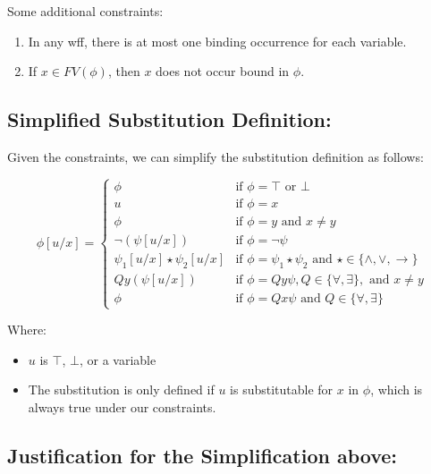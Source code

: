 \documentclass{article}
\begin{document}
Some additional constraints:
\begin{enumerate}
    \item In any wff, there is at most one binding occurrence for each variable.
    \item If $x \in FV(\phi)$, then $x$ does not occur bound in $\phi$.
\end{enumerate}

\subsection*{Simplified Substitution Definition:}

Given the constraints, we can simplify the substitution definition as follows:

\[
\phi[u/x] =
\begin{cases}
    \phi                   & \text{if } \phi = \top \text{ or } \bot \\
    u                      & \text{if } \phi = x \\
    \phi                   & \text{if } \phi = y \text{ and } x \neq y \\
    \neg(\psi[u/x])        & \text{if } \phi = \neg\psi \\
    \psi_1[u/x] \star \psi_2[u/x]  & \text{if } \phi = \psi_1 \star \psi_2 \text{ and } \star \in \{\wedge, \vee, \rightarrow\} \\
    Qy (\psi[u/x])         & \text{if } \phi = Qy \psi, Q \in \{\forall, \exists\}, \text{ and } x \neq y \\
    \phi                   & \text{if } \phi = Qx \psi \text{ and } Q \in \{\forall, \exists\}
\end{cases}
\]

Where:
\begin{itemize}
    \item $u$ is $\top$, $\bot$, or a variable
    \item The substitution is only defined if $u$ is substitutable for $x$ in $\phi$, which is always true under our constraints.
\end{itemize}

\subsection*{Justification for the  Simplification above:}
\end{document}
